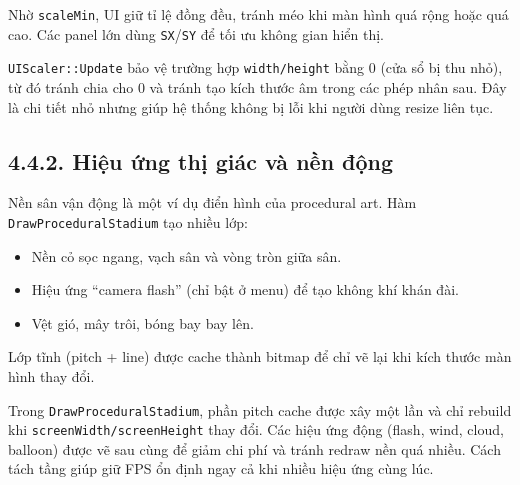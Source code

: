 \setlength{\parindent}{1.5em} Nhờ \texttt{scaleMin}, UI giữ tỉ lệ đồng đều, tránh méo khi màn hình quá rộng hoặc quá cao. Các panel lớn dùng \texttt{SX}/\texttt{SY} để tối ưu không gian hiển thị.

\setlength{\parindent}{1.5em} \texttt{UIScaler::Update} bảo vệ trường hợp \texttt{width/height} bằng 0 (cửa sổ bị thu nhỏ), từ đó tránh chia cho 0 và tránh tạo kích thước âm trong các phép nhân sau. Đây là chi tiết nhỏ nhưng giúp hệ thống không bị lỗi khi người dùng resize liên tục.

\subsection*{4.4.2. Hiệu ứng thị giác và nền động}

\setlength{\parindent}{1.5em} Nền sân vận động là một ví dụ điển hình của procedural art. Hàm \texttt{DrawProceduralStadium} tạo nhiều lớp:
\begin{itemize}
  \item Nền cỏ sọc ngang, vạch sân và vòng tròn giữa sân.
  \item Hiệu ứng ``camera flash'' (chỉ bật ở menu) để tạo không khí khán đài.
  \item Vệt gió, mây trôi, bóng bay bay lên.
\end{itemize}
\setlength{\parindent}{1.5em} Lớp tĩnh (pitch + line) được cache thành bitmap để chỉ vẽ lại khi kích thước màn hình thay đổi.

\setlength{\parindent}{1.5em} Trong \texttt{DrawProceduralStadium}, phần pitch cache được xây một lần và chỉ rebuild khi \texttt{screenWidth/screenHeight} thay đổi. Các hiệu ứng động (flash, wind, cloud, balloon) được vẽ sau cùng để giảm chi phí và tránh redraw nền quá nhiều. Cách tách tầng giúp giữ FPS ổn định ngay cả khi nhiều hiệu ứng cùng lúc.

